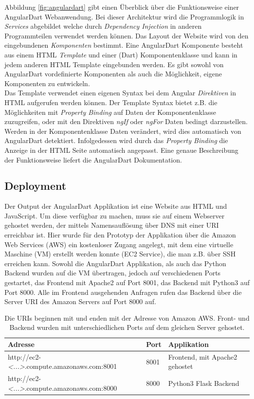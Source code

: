 Abbildung \ref{fig:angulardart} gibt einen Überblick über die Funktionsweise einer AngularDart Webanwendung. Bei dieser Architektur wird die Programmlogik in \textit{Services} abgebildet welche durch \textit{Dependency Injection} in anderen Programmteilen verwendet werden können. Das Layout der Website wird von den eingebundenen \textit{Komponenten} bestimmt. Eine AngularDart Komponente besteht aus einem HTML \textit{Template} und einer (Dart) Komponentenklasse und kann in jedem anderen HTML Template eingebunden werden. Es gibt sowohl von AngularDart vordefinierte Komponenten als auch die Möglichkeit, eigene Komponenten zu entwickeln.\\
Das Template verwendet einen eigenen Syntax bei dem Angular \textit{Direktiven} in HTML aufgerufen werden können. Der Template Syntax bietet z.B. die Möglichkeiten mit \textit{Property Binding} auf Daten der Komponentenklasse zuzugreifen, oder mit den Direktiven \textit{ngIf} oder \textit{ngFor} Daten bedingt darzustellen.\\Werden in der Komponentenklasse Daten verändert, wird dies automatisch von AngularDart detektiert. Infolgedessen wird durch das \textit{Property Binding} die Anzeige in der HTML Seite automatisch angepasst. Eine genaue Beschreibung der Funktionsweise liefert die AngularDart Dokumentation\cite{angularDart}.

\subsection{Deployment}
\label{sec:deployment}

Der Output der AngularDart Applikation ist eine Website aus HTML und JavaScript. Um diese verfügbar zu machen, muss sie auf einem Webserver gehostet werden, der mittels Namensauflösung über DNS mit einer URI erreichbar ist. Hier wurde für den Prototyp der Applikation über die Amazon Web Services (AWS) ein kostenloser Zugang angelegt, mit dem eine virtuelle Maschine (VM) erstellt werden konnte (EC2 Service\cite{amazonec2}), die man z.B. über SSH erreichen kann. Sowohl die AngularDart Applikation, als auch das Python Backend wurden auf die VM übertragen, jedoch auf verschiedenen Ports gestartet, das Frontend mit Apache2 auf Port 8001, das Backend mit Python3 auf Port 8000. Alle im Frontend ausgehenden Anfragen rufen das Backend über die Server URI des Amazon Servers auf Port 8000 auf.

\begin{table}[h!]
	\centering
	\begin{tabular}{|l|l|l|}
		\hline
		\textbf{Adresse} & \textbf{Port} & \textbf{Applikation}\\
		\hline
		\hline
		http://ec2-\textit{<...>}.compute.amazonaws.com:8001 & 8001 & Frontend, mit Apache2 gehostet\\
		\hline
		http://ec2-\textit{<...>}.compute.amazonaws.com:8000 & 8000 & Python3 Flask Backend\\
		\hline
	\end{tabular}
	\caption{Die URIs beginnen mit \textit{} und enden mit der Adresse von Amazon AWS. Front- und Backend wurden mit unterschiedlichen Ports auf dem gleichen Server gehostet.}
\end{table}

